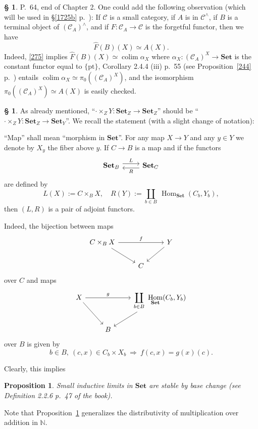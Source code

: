 \documentclass[12pt]{article}%
\newtheorem{prop}[thm]{Proposition}
\theoremstyle{remark}
\theoremstyle{definition}
\newtheorem{s}[thm]{\S}%
\newcommand{\bb}{\mathbb}
\newcommand{\C}{\mathcal C}
\newcommand{\Set}{\mathbf{Set}}
\newcommand{\pt}{\{\text{pt}\}}
\newcommand{\then}{\Rightarrow}
\DeclareMathOperator*{\colim}{colim}
\DeclareMathOperator{\Hom}{Hom}%
\begin{document}
%

\begin{s}
P.~64, end of Chapter 2. One could add the following observation (which will be used in \S\ref{1725b} p.~\pageref{1725b}): If $\C$ is a small category, if $A$ is in $\C^\wedge$, if $B$ is a terminal object of $(\C_A)^\wedge$, and if $F:\C_A\to\C$ is the forgetful functor, then we have 
\begin{equation}\label{1725}
\widehat F(B)(X)\simeq A(X).
\end{equation}
Indeed, \eqref{275} implies $\widehat F(B)(X)\simeq\colim\alpha_X$ where $\alpha_X:(\C_A)^X\to\Set$ is the constant functor equal to $\pt$, Corollary 2.4.4 (iii) p.~55 (see Proposition~\ref{244} p.~\pageref{244}) entails $\colim\alpha_X\simeq\pi_0((\C_A)^X)$, and the isomorphism $\pi_0((\C_A)^X)\simeq A(X)$ is easily checked.
\end{s}

%

\begin{s}\label{bc}
As already mentioned, ``$\cdot\times_ZY:\Set_Z\to\Set_Z$'' should be ``$\cdot\times_ZY:\Set_Z\to\Set_Y$''. We recall the statement (with a slight change of notation):

``Map'' shall mean ``morphism in $\Set$''. For any map $X\to Y$ and any $y\in Y$ we denote by $X_y$ the fiber above $y$. If $C\to B$ is a map and if the functors 
$$
\begin{tikzcd}
\Set_B\ar[yshift=.7ex]{r}{L}&\Set_C\ar[yshift=-.7ex]{l}{R}
\end{tikzcd}
$$ 
are defined by 
$$
L(X):=C\times_BX,\quad R(Y):=\coprod_{b\in B}\ \Hom_{\Set}(C_b,Y_b),
$$ 
then $(L,R)$ is a pair of adjoint functors.

Indeed, the bijection between maps
$$
\begin{tikzcd}
C\times_BX\ar{dr}\ar{rr}{f}&&Y\ar{dl}\\ 
{}&C
\end{tikzcd}
$$
over $C$ and maps
$$
\begin{tikzcd}
X\ar{dr}\ar{rr}{g}&&\displaystyle\coprod_{b\in B}\ \Hom_{\Set}(C_b,Y_b)\ar{dl}\\ 
{}&B
\end{tikzcd}
$$
over $B$ is given by 
$$
b\in B,\ (c,x)\in C_b\times X_b\ \then\ f(c,x)=g(x)(c).
$$

Clearly, this implies
%
\begin{prop}\label{sbc}
Small inductive limits in $\Set$ are stable by base change (see Definition 2.2.6 p.~47 of the book).
\end{prop}
%
Note that Proposition~\ref{sbc} generalizes the distributivity of multiplication over addition in $\bb N$.
\end{s}
\end{document}

